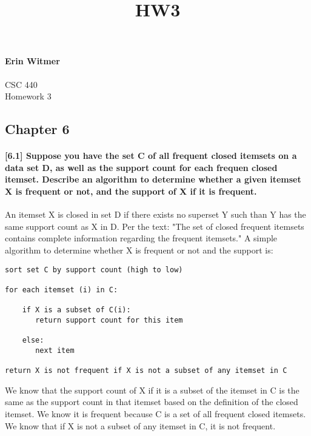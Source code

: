 \documentclass[11pt]{article}
\title{HW3}
\begin{document}
    
    
    \maketitle
    
    

    
    \paragraph{Erin Witmer}\label{erin-witmer}

CSC 440\\
Homework 3

    \subsection{Chapter 6}\label{chapter-6}

    \paragraph{{[}6.1{]} Suppose you have the set C of all frequent closed
itemsets on a data set D, as well as the support count for each frequen
closed itemset. Describe an algorithm to determine whether a given
itemset X is frequent or not, and the support of X if it is
frequent.}\label{suppose-you-have-the-set-c-of-all-frequent-closed-itemsets-on-a-data-set-d-as-well-as-the-support-count-for-each-frequen-closed-itemset.-describe-an-algorithm-to-determine-whether-a-given-itemset-x-is-frequent-or-not-and-the-support-of-x-if-it-is-frequent.}

    An itemset X is closed in set D if there exists no superset Y such than
Y has the same support count as X in D. Per the text: "The set of closed
frequent itemsets contains complete information regarding the frequent
itemsets." A simple algorithm to determine whether X is frequent or not
and the support is:

\begin{verbatim}
sort set C by support count (high to low)

for each itemset (i) in C:
    
    if X is a subset of C(i):
       return support count for this item 
            
    else:
       next item
    
return X is not frequent if X is not a subset of any itemset in C 
\end{verbatim}

We know that the support count of X if it is a subset of the itemset in
C is the same as the support count in that itemset based on the
definition of the closed itemset. We know it is frequent because C is a
set of all frequent closed itemsets. We know that if X is not a subset
of any itemset in C, it is not frequent.
\end{document}

